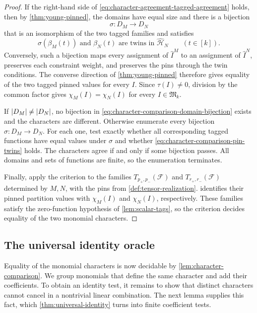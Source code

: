 \documentclass[11pt,letterpaper,onecolumn]{article}
\theoremstyle{plain}
\theoremstyle{definition}
\theoremstyle{remark}
\newcommand{\cF}{\mathcal F}
\newcommand{\InstMonoid}[1]{\mathfrak M_{#1}}
\DeclarePairedDelimiter{\abs}{\lvert}{\rvert}
\begin{document}
\begin{proof}
If the right-hand side of
\eqref{eq:character-agreement-tagged-agreement} holds, then by
\cref{thm:young-pinned}, the
domains have equal size and there is a bijection
\begin{equation}
  \sigma:D_M\to D_N
  \label{eq:character-comparison-domain-bijection}
\end{equation}
that is an isomorphism of the two tagged families and satisfies
\begin{equation}
  \sigma(\beta_M(t))
  \text{ and }\beta_N(t)
  \text{ are twins in }\widehat{\mathcal H}_N
  \qquad(t\in[k]).
  \label{eq:character-comparison-pin-twins}
\end{equation}
Conversely, such a bijection maps every assignment of
$\widehat I^M$ to an assignment of $\widehat I^N$, preserves each
constraint weight, and preserves the pins through the twin conditions.
The converse direction of \cref{thm:young-pinned} therefore gives equality of
the two tagged pinned values
for every $I$.  Since $\tau(I)\ne0$, division by the common factor gives
$\chi_M(I)=\chi_N(I)$ for every $I\in\InstMonoid{k}$.

If $\abs{D_M}\ne\abs{D_N}$, no
bijection in \eqref{eq:character-comparison-domain-bijection} exists and
the characters are different.  Otherwise enumerate every bijection
$\sigma:D_M\to D_N$.  For each one, test exactly whether all corresponding
tagged functions have equal values under $\sigma$ and whether
\eqref{eq:character-comparison-pin-twins} holds.  The characters agree if
and only if some bijection passes.  All domains and sets of functions are finite, so
the enumeration terminates.

Finally, apply the criterion to the families $T_{p_+,p_-}(\cF)$ and
$T_{r_+,r_-}(\cF)$ determined by $M,N$, with the pins from
\cref{def:tensor-realization}.   identifies
their pinned partition values with $\chi_M(I)$ and $\chi_N(I)$,
respectively.  These families satisfy the zero-function hypothesis of
\cref{lem:scalar-tags}, so the criterion decides equality of the two
monomial characters.
\end{proof}

\subsection{The universal identity oracle}
\label{subsec:identity-oracle}

Equality of the monomial characters is now decidable by
\cref{lem:character-comparison}.  We group monomials that define the same
character and add their coefficients.  To obtain an identity test, it
remains to show that distinct
characters cannot cancel in a nontrivial linear combination.  The next
lemma supplies this fact, which \cref{thm:universal-identity} turns into
finite coefficient tests.
\end{document}
